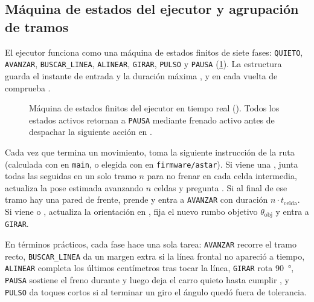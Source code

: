 \subsection{Máquina de estados del ejecutor y agrupación de tramos}
\label{subsec:fsm}

El ejecutor funciona como una máquina de estados finitos de siete fases: \texttt{QUIETO}, \texttt{AVANZAR}, \texttt{BUSCAR\_LINEA}, \texttt{ALINEAR}, \texttt{GIRAR}, \texttt{PULSO} y \texttt{PAUSA} (\cref{fig:fsm-ejecutor}). La estructura  guarda el instante de entrada  y la duración máxima , y en cada vuelta de  comprueba .

\begin{figure}[htbp]
  \centering
  
  \caption{Máquina de estados finitos del ejecutor en tiempo real (). Todos los estados activos retornan a \texttt{PAUSA} mediante frenado activo antes de despachar la siguiente acción en .}
  \label{fig:fsm-ejecutor}
\end{figure}

Cada vez que termina un movimiento,  toma la siguiente instrucción de la ruta (calculada con  en \texttt{main}, o elegida con  en \texttt{firmware/astar}). Si viene una , junta todas las  seguidas en un solo tramo $n$ para no frenar en cada celda intermedia, actualiza la pose estimada  avanzando $n$ celdas y pregunta . Si al final de ese tramo hay una pared de frente, prende  y entra a \texttt{AVANZAR} con duración $n \cdot t_{\text{celda}}$. Si viene  o , actualiza la orientación en , fija el nuevo rumbo objetivo $\theta_{\text{obj}}$ y entra a \texttt{GIRAR}.

En términos prácticos, cada fase hace una sola tarea: \texttt{AVANZAR} recorre el tramo recto, \texttt{BUSCAR\_LINEA} da un margen extra si la línea frontal no apareció a tiempo, \texttt{ALINEAR} completa los últimos centímetros tras tocar la línea, \texttt{GIRAR} rota \SI{90}{\degree}, \texttt{PAUSA} sostiene el freno durante  y luego deja el carro quieto hasta cumplir , y \texttt{PULSO} da toques cortos si al terminar un giro el ángulo quedó fuera de tolerancia.

